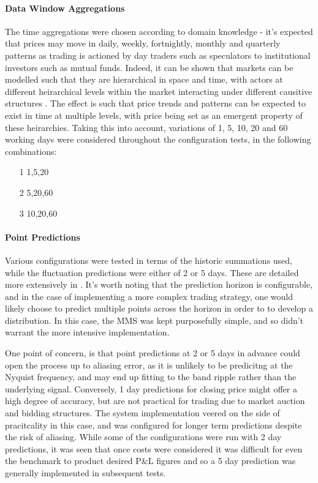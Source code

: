 \documentclass[a4paper,latin]{paper}
\begin{document}
\paragraph{Data Window Aggregations} The time aggregations were chosen according to domain knowledge - it's expected that prices may move in daily, weekly, fortnightly, monthly and quarterly patterns as trading is actioned by day traders such as speculators to institutional investors such as mutual funds. Indeed, it can be shown that markets can be modelled such that they are hierarchical in space and time, with actors at different heirarchical levels within the market interacting under different causitive structures \cite{Wilcox}. The effect is such that price trends and patterns can be expected to exist in time at multiple levels, with price being set as an emergent property of these heirarchies. Taking this into account, variations of 1, 5, 10, 20 and 60 working days were considered throughout the configuration tests, in the following combinations:  
\begin{itemize}
	\item[1] 1,5,20 
	\item[2] 5,20,60
	\item[3] 10,20,60
\end{itemize}

\paragraph {Point Predictions} Various configurations were tested in terms of the historic summations used, while the fluctuation predictions were either of 2 or 5 days. These are detailed more extensively in . It's worth noting that the prediction horizon is configurable, and in the case of implementing a more complex trading strategy, one would likely choose to predict multiple points across the horizon in order to to develop a distribution. In this case, the MMS was kept purposefully simple, and so didn't warrant the more intensive implementation. \newline

One point of concern, is that point predictions at 2 or 5 days in advance could open the process up to aliasing error, as it is unlikely to be predicitng at the Nyquist frequency, and may end up fitting to the band ripple rather than the underlying signal. Conversely, 1 day predictions for closing price might offer a high degree of accuracy, but are not practical for trading due to market auction and bidding structures. The system implementation veered on the side of pracitcality in this case, and was configured for longer term predictions despite the risk of aliasing. While some of the configurations were run with 2 day predictions, it was seen that once costs were considered it was difficult for even the benchmark to product desired P\&L figures and so a 5 day prediction was generally implemented in subsequent tests. 
\end{document}
